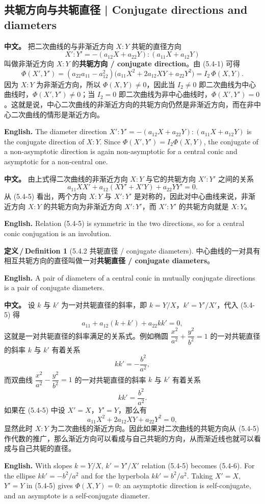 \documentclass[UTF8,11pt,a4paper]{ctexart}
\newcommand{\APS}[2]{\par\noindent\textbf{中文。} #1\par\noindent\textbf{English.} #2\par\smallskip}
\newcommand{\EN}[1]{\par\noindent \textbf{English.} #1\par}
\theoremstyle{definition}
\newtheorem*{definition}{定义\,/\,Definition}
\begin{document}
\subsection{共轭方向与共轭直径 | Conjugate directions and diameters}
\APS{把二次曲线的与非渐近方向 $X:Y$ 共轭的直径方向
\[
X':Y'=-(a_{12}X+a_{22}Y):(a_{11}X+a_{12}Y)
\]
叫做非渐近方向 $X:Y$ 的\textbf{共轭方向 / conjugate direction}。由 (5.4-1) 可得
\[
\Phi(X',Y')=(a_{22}a_{11}-a_{12}^2)\bigl(a_{11}X^2+2a_{12}XY+a_{22}Y^2\bigr)=I_2\,\Phi(X,Y).
\]
因为 $X:Y$ 为非渐近方向，所以 $\Phi(X,Y)\ne0$，因此当 $I_2\ne0$ 即二次曲线为中心曲线时，$\Phi(X',Y')\ne0$；当 $I_2=0$ 即二次曲线为非中心曲线时，$\Phi(X',Y')=0$。这就是说，中心二次曲线的非渐近方向的共轭方向仍然是非渐近方向，而在非中心二次曲线的情形是渐近方向。}{The diameter direction $X':Y'=-(a_{12}X+a_{22}Y):(a_{11}X+a_{12}Y)$ is the conjugate direction of $X:Y$. Since $\Phi(X',Y')=I_2\Phi(X,Y)$, the conjugate of a non-asymptotic direction is again non-asymptotic for a central conic and asymptotic for a non-central one.}

\APS{由上式得二次曲线的非渐近方向 $X:Y$ 与它的共轭方向 $X':Y'$ 之间的关系
\[
a_{11}XX'+a_{12}(XY'+X'Y)+a_{22}YY'=0.\tag{5.4-5}
\]
从 (5.4-5) 看出，两个方向 $X:Y$ 与 $X':Y'$ 是对称的，因此对中心曲线来说，非渐近方向 $X:Y$ 的共轭方向为非渐近方向 $X':Y'$，而 $X':Y'$ 的共轭方向就是 $X:Y$。}{Relation (5.4-5) is symmetric in the two directions, so for a central conic conjugation is an involution.}

\begin{definition}[5.4.2 共轭直径 / conjugate diameters]\label{def:conjdiam}
中心曲线的一对具有相互共轭方向的直径叫做一对\textbf{共轭直径 / conjugate diameters}。
\EN{A pair of diameters of a central conic in mutually conjugate directions is a pair of conjugate diameters.}
\end{definition}

\APS{设 $k$ 与 $k'$ 为一对共轭直径的斜率，即 $k=Y/X$，$k'=Y'/X'$，代入 (5.4-5) 得
\[
a_{11}+a_{12}(k+k')+a_{22}kk'=0,\tag{5.4-6}
\]
这就是一对共轭直径的斜率满足的关系式。例如椭圆 $\dfrac{x^2}{a^2}+\dfrac{y^2}{b^2}=1$ 的一对共轭直径的斜率 $k$ 与 $k'$ 有着关系
\[
kk'=-\frac{b^2}{a^2},\tag{5.4-7}
\]
而双曲线 $\dfrac{x^2}{a^2}-\dfrac{y^2}{b^2}=1$ 的一对共轭直径的斜率 $k$ 与 $k'$ 有着关系
\[
kk'=\frac{b^2}{a^2}.\tag{5.4-8}
\]
如果在 (5.4-5) 中设 $X'=X$，$Y'=Y$，那么有
\[
a_{11}X^2+2a_{12}XY+a_{22}Y^2=0,
\]
显然此时 $X:Y$ 为二次曲线的渐近方向。因此如果对二次曲线的共轭方向从 (5.4-5) 作代数的推广，那么渐近方向可以看成与自己共轭的方向，从而渐近线也就可以看成与自己共轭的直径。}{With slopes $k=Y/X$, $k'=Y'/X'$ relation (5.4-5) becomes (5.4-6). For the ellipse $kk'=-b^2/a^2$ and for the hyperbola $kk'=b^2/a^2$. Taking $X'=X$, $Y'=Y$ in (5.4-5) gives $\Phi(X,Y)=0$: an asymptotic direction is self-conjugate, and an asymptote is a self-conjugate diameter.}
\end{document}
